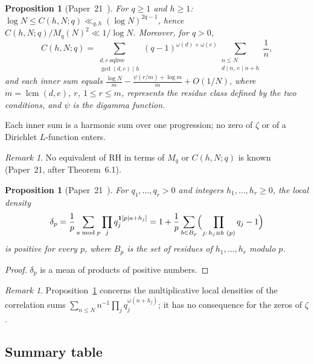\documentclass[11pt]{amsart}
\newtheorem{proposition}[theorem]{Proposition}
\theoremstyle{definition}
\theoremstyle{remark}
\newtheorem{remark}[theorem]{Remark}
\newcommand{\om}{\omega}
\begin{document}
\begin{proposition}[{Paper~21~\cite[Prop.~5.2 and Thm.~5.3]{P21}}]
\label{thm:T4}
For $q\ge1$ and $h\ge1$: $\log N\le C(h,N;q)\ll_{q,h}(\log N)^{2q-1}$, hence
$C(h,N;q)/M_q(N)^2\ll1/\log N$. Moreover, for $q>0$,
\begin{equation}
  \label{eq:Aq}
  C(h,N;q)=\sum_{\substack{d,e\ \mathrm{sqfree}\\\gcd(d,e)\mid h}}(q-1)^{\om(d)+\om(e)}
  \sum_{\substack{n\le N\\ d\mid n,\ e\mid n+h}}\frac1n ,
\end{equation}
and each inner sum equals
$\frac{\log N}{m}-\frac{\psi(r/m)+\log m}{m}+O(1/N)$, where $m=\operatorname{lcm}(d,e)$,
$r$, $1\le r\le m$, represents the residue class defined by the two conditions, and $\psi$ is the digamma
function.
\end{proposition}

Each inner sum is a harmonic sum over one progression; no zero of $\zeta$ or of a
Dirichlet $L$-function enters.

\begin{remark}
\label{thm:T4.1}
No equivalent of RH in terms of $M_q$ or $C(h,N;q)$ is known (Paper~21, after
Theorem~6.1).
\end{remark}

\begin{proposition}[{Paper~21~\cite[Thm.~7.1]{P21}}]
\label{thm:T5}
For $q_1,\dots,q_r>0$ and integers $h_1,\dots,h_r\ge0$, the local density
\[
  \delta_p=\frac1p\sum_{a\bmod p}\prod_{j}q_j^{\mathbf 1[p\mid a+h_j]}
  =1+\frac1p\sum_{b\in B_p}\Bigl(\prod_{j:\,h_j\equiv b\ (p)}q_j-1\Bigr)
\]
is positive for every $p$, where $B_p$ is the set of residues of $h_1,\dots,h_r$
modulo $p$.
\end{proposition}

\begin{proof}
$\delta_p$ is a mean of products of positive numbers.
\end{proof}

\begin{remark}
Proposition~\ref{thm:T5} concerns the multiplicative local densities of the correlation
sums $\sum_{n\le N}n^{-1}\prod_jq_j^{\om(n+h_j)}$; it has no consequence for the zeros
of $\zeta$.
\end{remark}

\subsection{Summary table}
\end{document}
